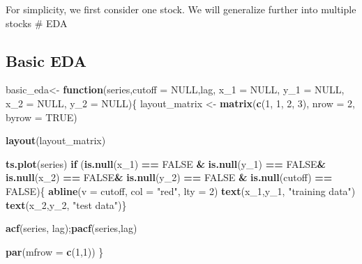 \documentclass[
]{article}
\newenvironment{Shaded}{\begin{snugshade}}{\end{snugshade}}
\newcommand{\AttributeTok}[1]{\textcolor[rgb]{0.13,0.29,0.53}{#1}}
\newcommand{\ConstantTok}[1]{\textcolor[rgb]{0.56,0.35,0.01}{#1}}
\newcommand{\ControlFlowTok}[1]{\textcolor[rgb]{0.13,0.29,0.53}{\textbf{#1}}}
\newcommand{\DecValTok}[1]{\textcolor[rgb]{0.00,0.00,0.81}{#1}}
\newcommand{\FunctionTok}[1]{\textcolor[rgb]{0.13,0.29,0.53}{\textbf{#1}}}
\newcommand{\NormalTok}[1]{#1}
\newcommand{\OtherTok}[1]{\textcolor[rgb]{0.56,0.35,0.01}{#1}}
\newcommand{\SpecialCharTok}[1]{\textcolor[rgb]{0.81,0.36,0.00}{\textbf{#1}}}
\newcommand{\StringTok}[1]{\textcolor[rgb]{0.31,0.60,0.02}{#1}}
\begin{document}
\begin{Shaded}
\end{Shaded}

For simplicity, we first consider one stock. We will generalize further
into multiple stocks \# EDA

\subsection{Basic EDA}\label{basic-eda}

\begin{Shaded}
\begin{Highlighting}[]
\NormalTok{basic\_eda}\OtherTok{\textless{}{-}} \ControlFlowTok{function}\NormalTok{(series,}\AttributeTok{cutoff =} \ConstantTok{NULL}\NormalTok{,lag, }\AttributeTok{x\_1 =} \ConstantTok{NULL}\NormalTok{, }\AttributeTok{y\_1 =} \ConstantTok{NULL}\NormalTok{, }\AttributeTok{x\_2 =} \ConstantTok{NULL}\NormalTok{, }\AttributeTok{y\_2 =} \ConstantTok{NULL}\NormalTok{)\{}
\NormalTok{  layout\_matrix }\OtherTok{\textless{}{-}} \FunctionTok{matrix}\NormalTok{(}\FunctionTok{c}\NormalTok{(}\DecValTok{1}\NormalTok{, }\DecValTok{1}\NormalTok{,}
                            \DecValTok{2}\NormalTok{, }\DecValTok{3}\NormalTok{),}
                          \AttributeTok{nrow =} \DecValTok{2}\NormalTok{, }\AttributeTok{byrow =} \ConstantTok{TRUE}\NormalTok{)}

  \FunctionTok{layout}\NormalTok{(layout\_matrix)}

  \FunctionTok{ts.plot}\NormalTok{(series)}
  \ControlFlowTok{if}\NormalTok{ (}\FunctionTok{is.null}\NormalTok{(x\_1) }\SpecialCharTok{==} \ConstantTok{FALSE} \SpecialCharTok{\&} \FunctionTok{is.null}\NormalTok{(y\_1) }\SpecialCharTok{==} \ConstantTok{FALSE}\SpecialCharTok{\&} \FunctionTok{is.null}\NormalTok{(x\_2) }\SpecialCharTok{==} \ConstantTok{FALSE}\SpecialCharTok{\&} \FunctionTok{is.null}\NormalTok{(y\_2) }\SpecialCharTok{==} \ConstantTok{FALSE} \SpecialCharTok{\&} \FunctionTok{is.null}\NormalTok{(cutoff) }\SpecialCharTok{==} \ConstantTok{FALSE}\NormalTok{)\{}
    \FunctionTok{abline}\NormalTok{(}\AttributeTok{v =}\NormalTok{ cutoff, }\AttributeTok{col =} \StringTok{"red"}\NormalTok{, }\AttributeTok{lty =} \DecValTok{2}\NormalTok{)}
    \FunctionTok{text}\NormalTok{(x\_1,y\_1, }\StringTok{"training data"}\NormalTok{)}
    \FunctionTok{text}\NormalTok{(x\_2,y\_2, }\StringTok{"test data"}\NormalTok{)\}}


  \FunctionTok{acf}\NormalTok{(series, lag);}\FunctionTok{pacf}\NormalTok{(series,lag)}


  \FunctionTok{par}\NormalTok{(}\AttributeTok{mfrow =} \FunctionTok{c}\NormalTok{(}\DecValTok{1}\NormalTok{,}\DecValTok{1}\NormalTok{))}
\NormalTok{\}}
\end{Highlighting}
\end{Shaded}
\end{document}
